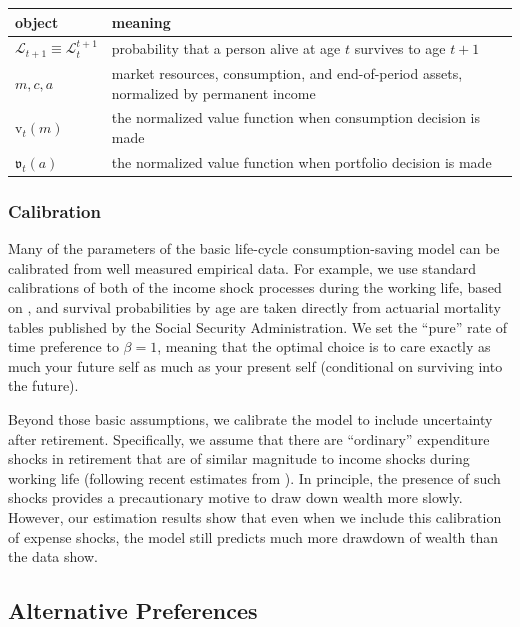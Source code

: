 \documentclass{article}
\newcommand{\vFunc}{\mathrm{v}}
\newcommand{\Alive}{\mathcal{L}}
\newcommand{\cNrm}{c}
\newcommand{\aNrm}{a}
\newcommand{\mNrm}{m}
\begin{document}
\bigskip\noindent
\begin{tabular}{p{}p{}}
\toprule
object & meaning \\
\hline
$\Alive_{t+1} \equiv \Alive_{t}^{t+1}$ & probability that a person alive at age $t$ survives to age $t+1$ \\
$\mNrm, \cNrm, \aNrm$ & market resources, consumption, and end-of-period assets, normalized by permanent income \\
$\vFunc_{t}(\mNrm)$ & the normalized value function when consumption decision is made \\
$\mathfrak{v}_{t}(\aNrm)$ & the normalized value function when portfolio decision is made \\
\bottomrule
\end{tabular}

\bigskip\subsubsection{Calibration}

Many of the parameters of the basic life-cycle consumption-saving model can be calibrated from well measured empirical data.
For example, we use standard calibrations of both of the income shock processes during the working life, based on \cite{Cagetti2003}, and
survival probabilities by age are taken directly from actuarial mortality tables published by the Social Security Administration.
We set the ``pure'' rate of time preference to $\beta=1$, meaning that the optimal choice is to care exactly as much your future self as much as your present self (conditional on surviving into the future).

Beyond those basic assumptions, we calibrate the model to include uncertainty after retirement.
Specifically, we assume that there are ``ordinary'' expenditure shocks in retirement that are of similar magnitude to income shocks during working life (following recent estimates from  \cite{flExpShocks}).
In principle, the presence of such shocks provides a precautionary motive to draw down wealth more slowly.
However, our estimation results show that even when we include this calibration of expense shocks, the model still predicts much more drawdown of wealth than the data show.

\subsection{Alternative Preferences}
\end{document}

